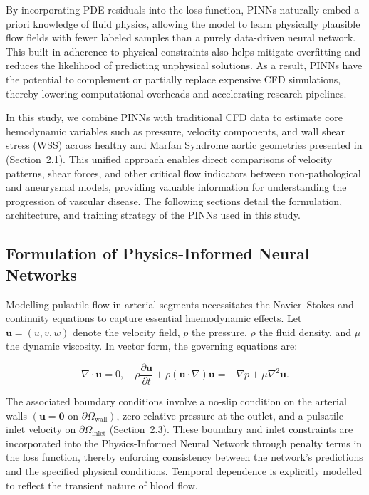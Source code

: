\documentclass[12pt, a4paper]{article}
\begin{document}
By incorporating PDE residuals into the loss function, PINNs naturally embed a priori knowledge of fluid physics, allowing the model to learn physically plausible flow fields with fewer labeled samples than a purely data-driven neural network. This built-in adherence to physical constraints also helps mitigate overfitting and reduces the likelihood of predicting unphysical solutions. As a result, PINNs have the potential to complement or partially replace expensive CFD simulations, thereby lowering computational overheads and accelerating research pipelines.

In this study, we combine PINNs with traditional CFD data to estimate core hemodynamic variables such as pressure, velocity components, and wall shear stress (WSS) across healthy and Marfan Syndrome aortic geometries presented in (Section~2.1). This unified approach enables direct comparisons of velocity patterns, shear forces, and other critical flow indicators between non-pathological and aneurysmal models, providing valuable information for understanding the progression of vascular disease. The following sections detail the formulation, architecture, and training strategy of the PINNs used in this study.

\subsection{Formulation of Physics-Informed Neural Networks}
\label{sec:PINN_Formulation}

Modelling pulsatile flow in arterial segments necessitates the Navier--Stokes and continuity equations to capture essential haemodynamic effects. Let \(\mathbf{u} = (u,v,w)\) denote the velocity field, \(p\) the pressure, \(\rho\) the fluid density, and \(\mu\) the dynamic viscosity. In vector form, the governing equations are:

\begin{equation}
\nabla \cdot \mathbf{u} = 0, 
\quad
\rho \frac{\partial \mathbf{u}}{\partial t} + \rho (\mathbf{u} \cdot \nabla)\mathbf{u}
= -\nabla p + \mu \nabla^2 \mathbf{u}.
\label{eq:navier_stokes}
\end{equation}

The associated boundary conditions involve a no-slip condition on the arterial walls \((\mathbf{u}=\mathbf{0} \text{ on } \partial\Omega_{\text{wall}})\), zero relative pressure at the outlet, and a pulsatile inlet velocity on \(\partial\Omega_{\text{inlet}}\) (Section~2.3). These boundary and inlet constraints are incorporated into the Physics-Informed Neural Network through penalty terms in the loss function, thereby enforcing consistency between the network’s predictions and the specified physical conditions. Temporal dependence is explicitly modelled to reflect the transient nature of blood flow.
\end{document}
